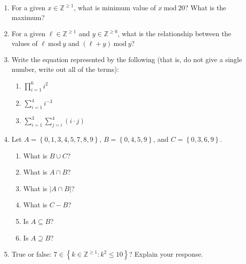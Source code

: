 \documentclass[11pt, oneside]{article}   	%
\renewcommand{\mod}{\ \mathrm{mod}\ }
\begin{document}
\begin{enumerate}


\item
For a given $x\in\mathbb{Z}^{\ge1}$, what is minimum value of \underline{$x\mod 20$}? What is the maximum? 
\vspace{3em}

\item 
For a given $\ell \in\mathbb{Z}^{\ge1}$ and $y\in\mathbb{Z}^{\ge0}$, what is the relationship between the values of \underline{$\ell\mod y$} and \underline{$(\ell + y) \mod y$}?
\vspace{3em}

\item Write the equation represented by the following (that is, do not give a single number, write out all of the terms):
\begin{enumerate}
\item $\displaystyle\prod_{i=1}^{6} i^2$\vspace{2em}
\item $\displaystyle\sum_{i=1}^{4} i^{-3}$\vspace{2em}
\item $\displaystyle\sum_{i=1}^{3}\sum_{j=i}^{4} (i \cdot j)$\vspace{2em}
\end{enumerate}

\item 
Let $A = \left\{0,1,3,4,5,7,8,9\right\}$, $B = \left\{0,4,5,9\right\}$, and $C = \left\{0,3,6,9\right\}$.
\begin{enumerate}
\item What is $B\cup C$? \vspace{2em}
\item What is $A\cap B$? \vspace{2em}
\item What is $|A\cap B|$? \vspace{2em}
\item What is $C-B$? \vspace{2em}
\item Is $A \subseteq B$?\vspace{2em}
\item Is $A \supseteq B$?\vspace{2em}

\end{enumerate}


\item True or false: $7 \in \left\{k \in \mathbb{Z}^{\ge1} : k^2 \le 10\right\}$? Explain your response. \vspace{3em}


\end{enumerate}
\end{document}
